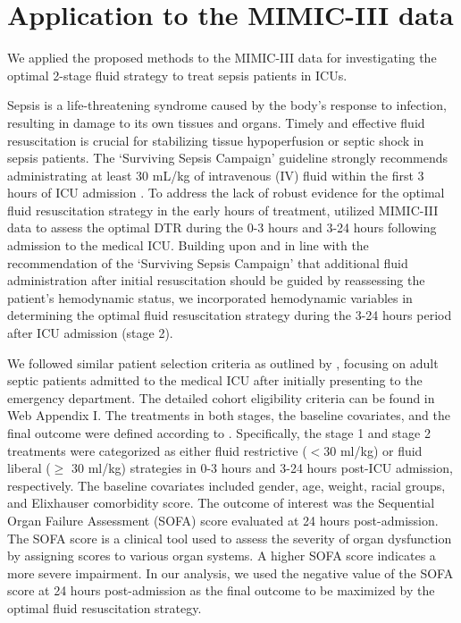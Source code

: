 \documentclass[12pt]{article}
\begin{document}
\section{Application to the MIMIC-III data}

We applied the proposed methods to the MIMIC-III data \citep{Johnson_et_al_2016} for investigating the optimal 2-stage fluid strategy to treat sepsis patients in ICUs. 

Sepsis is a life-threatening syndrome caused by the body’s response to infection, resulting in damage to its own tissues and organs. Timely and effective fluid resuscitation is crucial for stabilizing tissue hypoperfusion or septic shock in sepsis patients. The `Surviving Sepsis Campaign' guideline strongly recommends administrating at least 30 mL/kg of intravenous (IV) fluid within the first 3 hours of ICU admission \citep{Rhodes_et_al_2017}.  To address the lack of robust evidence for the optimal fluid resuscitation strategy in the early hours of treatment, \cite{Speth_et_al_2022} utilized MIMIC-III data to assess the optimal DTR during the 0-3 hours and 3-24 hours following admission to the medical ICU. Building upon \cite{Speth_et_al_2022} and in line with the recommendation of the `Surviving Sepsis Campaign' that additional fluid administration after initial resuscitation should be guided by reassessing the patient's hemodynamic status, we incorporated hemodynamic variables in determining the optimal fluid resuscitation strategy during the 3-24 hours period after ICU admission (stage 2). 


We followed similar patient selection criteria as outlined by \cite{Speth_et_al_2022}, focusing on adult septic patients admitted to the medical ICU after initially presenting to the emergency department. The detailed cohort eligibility criteria can be found in Web Appendix I. The treatments in both stages, the baseline covariates, and the final outcome were defined according to \cite{Speth_et_al_2022}. Specifically, the stage 1 and stage 2 treatments were categorized as either fluid restrictive ($<$30 ml/kg) or fluid liberal ($\geq$ 30 ml/kg) strategies in 0-3 hours and 3-24 hours post-ICU admission, respectively. The baseline covariates included gender, age, weight, racial groups, and Elixhauser comorbidity score. The outcome of interest was the Sequential Organ Failure Assessment (SOFA) score evaluated at 24 hours post-admission. The SOFA score is a clinical tool used to assess the severity of organ dysfunction by assigning scores to various organ systems. A higher SOFA score indicates a more severe impairment. In our analysis, we used the negative value of the SOFA score at 24 hours post-admission as the final outcome to be maximized by the optimal fluid resuscitation strategy.
\end{document}
